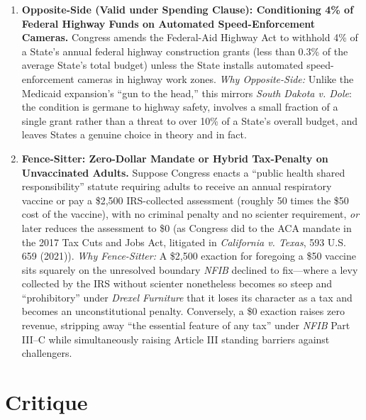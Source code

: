 \documentclass[12pt]{article}
\begin{document}
\begin{enumerate}
\item \textbf{Opposite-Side (Valid under Spending Clause): Conditioning 4\% of Federal Highway Funds on Automated Speed-Enforcement Cameras.} Congress amends the Federal-Aid Highway Act to withhold 4\% of a State's annual federal highway construction grants (less than 0.3\% of the average State's total budget) unless the State installs automated speed-enforcement cameras in highway work zones. \textit{Why Opposite-Side:} Unlike the Medicaid expansion's ``gun to the head,'' this mirrors \textit{South Dakota v. Dole}: the condition is germane to highway safety, involves a small fraction of a single grant rather than a threat to over 10\% of a State's overall budget, and leaves States a genuine choice in theory and in fact.

\item \textbf{Fence-Sitter: Zero-Dollar Mandate or Hybrid Tax-Penalty on Unvaccinated Adults.} Suppose Congress enacts a ``public health shared responsibility'' statute requiring adults to receive an annual respiratory vaccine or pay a \$2,500 IRS-collected assessment (roughly 50 times the \$50 cost of the vaccine), with no criminal penalty and no scienter requirement, \textit{or} later reduces the assessment to \$0 (as Congress did to the ACA mandate in the 2017 Tax Cuts and Jobs Act, litigated in \textit{California v. Texas}, 593 U.S. 659 (2021)). \textit{Why Fence-Sitter:} A \$2,500 exaction for foregoing a \$50 vaccine sits squarely on the unresolved boundary \textit{NFIB} declined to fix---where a levy collected by the IRS without scienter nonetheless becomes so steep and ``prohibitory'' under \textit{Drexel Furniture} that it loses its character as a tax and becomes an unconstitutional penalty. Conversely, a \$0 exaction raises zero revenue, stripping away ``the essential feature of any tax'' under \textit{NFIB} Part III--C while simultaneously raising Article III standing barriers against challengers.
\end{enumerate}

\section{Critique}
\end{document}
